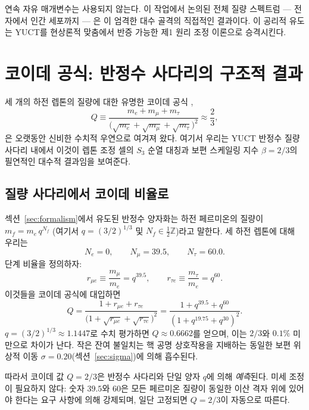 \documentclass[11pt,a4paper]{article}
\begin{document}
	연속 자유 매개변수는 사용되지 않는다. 이 작업에서 논의된 전체 질량 스펙트럼 — 전자에서 인간 세포까지 — 은 이 엄격한 대수 골격의 직접적인 결과이다. 이 공리적 유도는 YUCT를 현상론적 맞춤에서 반증 가능한 제1 원리 조정 이론으로 승격시킨다.
	
	\section{코이데 공식: 반정수 사다리의 구조적 결과}
	\label{sec:koide}
	
	세 개의 하전 렙톤의 질량에 대한 유명한 코이데 공식 \cite{Koide1983},
	\begin{equation}
		Q \equiv \frac{m_e + m_\mu + m_\tau}{\bigl(\sqrt{m_e} + \sqrt{m_\mu} + \sqrt{m_\tau}\bigr)^2}
		\approx \frac{2}{3},
	\end{equation}
	은 오랫동안 신비한 수치적 우연으로 여겨져 왔다. 여기서 우리는 YUCT 반정수 질량 사다리 내에서 이것이 렙톤 조정 셀의 \(S_3\) 순열 대칭과 보편 스케일링 지수 \(\beta = 2/3\)의 필연적인 대수적 결과임을 보여준다.
	
	\subsection{질량 사다리에서 코이데 비율로}
	
	섹션~\ref{sec:formalism}에서 유도된 반정수 양자화는 하전 페르미온의 질량이 \(m_f = m_e \, q^{N_f}\) (여기서 \(q = (3/2)^{1/3}\) 및 \(N_f \in \frac12\mathbb{Z}\))라고 말한다. 세 하전 렙톤에 대해 우리는
	\[
	N_e = 0,\qquad N_\mu = 39.5,\qquad N_\tau = 60.0 .
	\]
	단계 비율을 정의하자:
	\[
	r_{\mu e} \equiv \frac{m_\mu}{m_e} = q^{39.5},\qquad
	r_{\tau e} \equiv \frac{m_\tau}{m_e} = q^{60}.
	\]
	이것들을 코이데 공식에 대입하면
	\begin{equation}
		Q = \frac{1 + r_{\mu e} + r_{\tau e}}{\bigl(1 + \sqrt{r_{\mu e}} + \sqrt{r_{\tau e}}\bigr)^2}
		= \frac{1 + q^{39.5} + q^{60}}{(1 + q^{19.75} + q^{30})^2}.
		\label{eq:Q_ladder}
	\end{equation}
	\(q = (3/2)^{1/3} \approx 1.1447\)로 수치 평가하면 \(Q \approx 0.6662\)를 얻으며, 이는 \(2/3\)와 \(0.1\%\) 미만으로 차이가 난다. 작은 잔여 불일치는 핵 공명 상호작용을 지배하는 동일한 보편 위상적 이동 \(\sigma = 0.20\)(섹션~\ref{sec:sigma})에 의해 흡수된다.
	
	따라서 코이데 값 \(Q = 2/3\)은 반정수 사다리와 단일 양자 \(q\)에 의해 \emph{예측}된다. 미세 조정이 필요하지 않다: 숫자 \(39.5\)와 \(60\)은 모든 페르미온 질량이 동일한 이산 격자 위에 있어야 한다는 요구 사항에 의해 강제되며, 일단 고정되면 \(Q = 2/3\)이 자동으로 따른다.
	
\end{document}
